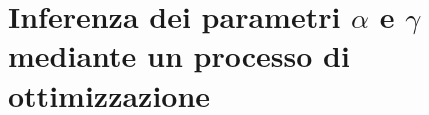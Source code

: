 \chapter{Inferenza dei parametri $\alpha$ e $\gamma$ mediante un processo di ottimizzazione}
\label{chap:pso}